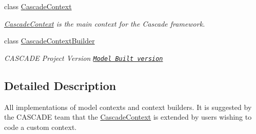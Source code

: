 \begin{DoxyCompactItemize}
class \hyperlink{classuk_1_1ac_1_1dmu_1_1iesd_1_1cascade_1_1context_1_1_cascade_context}{Cascade\-Context}
\begin{DoxyCompactList}\small\item\em {\itshape \hyperlink{classuk_1_1ac_1_1dmu_1_1iesd_1_1cascade_1_1context_1_1_cascade_context}{Cascade\-Context}} is the main context for the {\itshape Cascade} framework. \end{DoxyCompactList}\item 
class \hyperlink{classuk_1_1ac_1_1dmu_1_1iesd_1_1cascade_1_1context_1_1_cascade_context_builder}{Cascade\-Context\-Builder}
\begin{DoxyCompactList}\small\item\em C\-A\-S\-C\-A\-D\-E Project Version \href{Version# for the entire project/ as whole}{\tt Model Built version} \end{DoxyCompactList}\end{DoxyCompactItemize}


\subsection{Detailed Description}
All implementations of model contexts and context builders. It is suggested by the C\-A\-S\-C\-A\-D\-E team that the \hyperlink{classuk_1_1ac_1_1dmu_1_1iesd_1_1cascade_1_1context_1_1_cascade_context}{Cascade\-Context} is extended by users wishing to code a custom context. 
